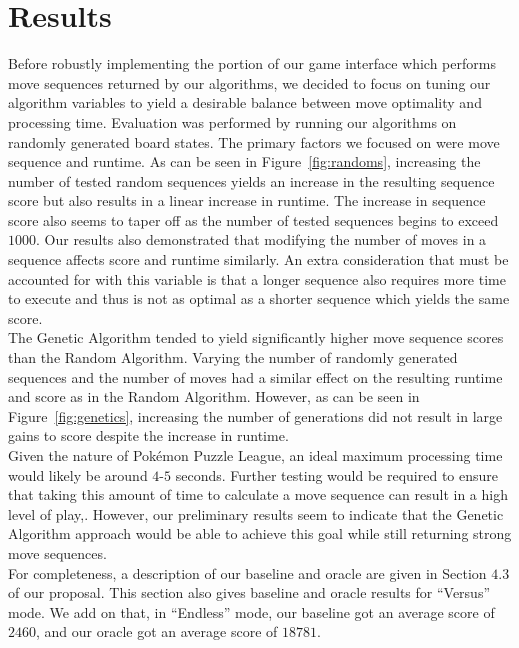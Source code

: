 \documentclass[10pt, final]{article}
\newcommand{\br}[1][.75]{\ \\[#1\baselineskip]}
\begin{document}
\section{Results}
Before robustly implementing the portion of our game interface which performs move sequences returned by our algorithms, we decided to focus on tuning our algorithm variables to yield a desirable balance between move optimality and processing time. Evaluation was performed by running our algorithms on randomly generated board states. The primary factors we focused on were move sequence and runtime. As can be seen in Figure~\ref{fig:randoms}, increasing the number of tested random sequences yields an increase in the resulting sequence score but also results in a linear increase in runtime. The increase in sequence score also seems to taper off as the number of tested sequences begins to exceed $1000$. Our results also demonstrated that modifying the number of moves in a sequence affects score and runtime similarly. An extra consideration that must be accounted for with this variable is that a longer sequence also requires more time to execute and thus is not as optimal as a shorter sequence which yields the same score.\br
The Genetic Algorithm tended to yield significantly higher move sequence scores than the Random Algorithm. Varying the number of randomly generated sequences and the number of moves had a similar effect on the resulting runtime and score as in the Random Algorithm. However, as can be seen in Figure~\ref{fig:genetics}, increasing the number of generations did not result in large gains to score despite the increase in runtime. \br
Given the nature of Pok\'{e}mon Puzzle League, an ideal maximum processing time would likely be around $4$-$5$ seconds. Further testing would be required to ensure that taking this amount of time to calculate a move sequence can result in a high level of play,. However, our preliminary results seem to indicate that the Genetic Algorithm approach would be able to achieve this goal while still returning strong move sequences.\br
For completeness, a description of our baseline and oracle are given in Section $4.3$ of our proposal. This section also gives baseline and oracle results for ``Versus'' mode. We add on that, in ``Endless'' mode, our baseline got an average score of $2460$, and our oracle got an average score of $18781$.
\end{document}
